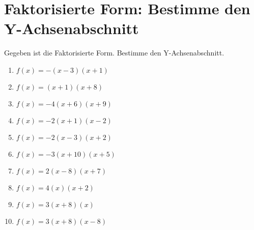 \documentclass{article}%
\begin{document}
\section{Faktorisierte Form: Bestimme den Y{-}Achsenabschnitt}%
\label{sec:FaktorisierteFormBestimmedenY{-}Achsenabschnitt}%
Gegeben ist die Faktorisierte Form. Bestimme den Y{-}Achsenabschnitt.%
\begin{enumerate}[label=\alph*)]%
\item%
\newline\vspace{0.5cm} $f(x)=-(x-3)(x+1)$%
\item%
\newline\vspace{0.5cm} $f(x)=(x+1)(x+8)$%
\item%
\newline\vspace{0.5cm} $f(x)=-4(x+6)(x+9)$%
\item%
\newline\vspace{0.5cm} $f(x)=-2(x+1)(x-2)$%
\item%
\newline\vspace{0.5cm} $f(x)=-2(x-3)(x+2)$%
\item%
\newline\vspace{0.5cm} $f(x)=-3(x+10)(x+5)$%
\item%
\newline\vspace{0.5cm} $f(x)=2(x-8)(x+7)$%
\item%
\newline\vspace{0.5cm} $f(x)=4(x)(x+2)$%
\item%
\newline\vspace{0.5cm} $f(x)=3(x+8)(x)$%
\item%
\newline\vspace{0.5cm} $f(x)=3(x+8)(x-8)$%
\end{enumerate}

%
\end{document}
